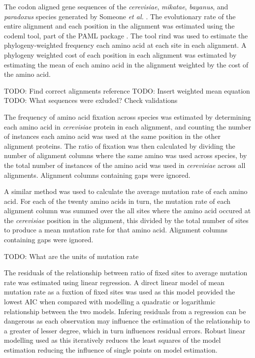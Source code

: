 The codon aligned gene sequences of the \emph{cerevisiae}, \emph{mikatae}, \emph{bayanus}, and \emph{paradoxus} species generated by Someone \emph{et al.} \cite{alignments}. The evolutionary rate of the entire alignment and each position in the alignment was estimated using the codeml tool, part of the PAML package \cite{paml}. The tool rind \cite{rind} was used to estimate the phylogeny-weighted frequency each amino acid at each site in each alignment. A phylogeny weighted cost of each position in each alignment was estimated by estimating the mean of each amino acid in the alignment weighted by the cost of the amino acid.

TODO: Find correct alignments reference
TODO: Insert weighted mean equation
TODO: What sequences were exluded? Check validations

The frequency of amino acid fixation across species was estimated by determining each amino acid in \emph{cerevisiae} protein in each alignment, and counting the number of instances each amino acid was used at the same position in the other alignment proteins. The ratio of fixation was then calculated by dividing the number of alignment columns where the same amino was used across species, by the total number of instances of the amino acid was used in \emph{cerevisiae} across all alignments. Alignment columns containing gaps were ignored.

A similar method was used to calculate the average mutation rate of each amino acid. For each of the twenty amino acids in turn, the mutation rate of each alignment column was summed over the all sites where the amino acid occured at the \emph{cerevisiae} position in the alignment, this divided by the total number of sites to produce a mean mutation rate for that amino acid. Alignment columns containing gaps were ignored.

TODO: What are the units of mutation rate

The residuals of the relationship between ratio of fixed sites to average mutation rate was estimated using linear regression. A direct linear model of mean mutation rate as a fuxtion of fixed sites was used as this model provided the lowest AIC when compared with modelling a quadratic or logarithmic relationship between the two models. Infering residuals from a regression can be dangerous as each observation may influence the estimation of the relationship to a greater of lesser degree, which in turn influences residual errors. Robust linear modelling used as this iteratively reduces the least squares of the model estimation reducing the influence of single points on model estimation.


